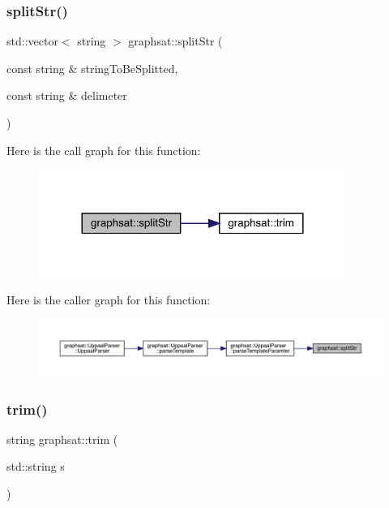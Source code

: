 \subsubsection{\texorpdfstring{splitStr()}{splitStr()}}
{\footnotesize\ttfamily std\+::vector$<$ string $>$ graphsat\+::split\+Str (\begin{DoxyParamCaption}\item[{const string \&}]{string\+To\+Be\+Splitted,  }\item[{const string \&}]{delimeter }\end{DoxyParamCaption})}

Here is the call graph for this function\+:
\nopagebreak
\begin{figure}[H]
\begin{center}
\leavevmode
\includegraphics[width=284pt]{namespacegraphsat_a767ef8183b8eada3700a18101d3444a8_cgraph}
\end{center}
\end{figure}
Here is the caller graph for this function\+:
\nopagebreak
\begin{figure}[H]
\begin{center}
\leavevmode
\includegraphics[width=350pt]{namespacegraphsat_a767ef8183b8eada3700a18101d3444a8_icgraph}
\end{center}
\end{figure}
\mbox{\label{namespacegraphsat_ae996ede22924c81a18a6697de7bcf9d5}} 
\subsubsection{\texorpdfstring{trim()}{trim()}}
{\footnotesize\ttfamily string graphsat\+::trim (\begin{DoxyParamCaption}\item[{std\+::string}]{s }\end{DoxyParamCaption})}

